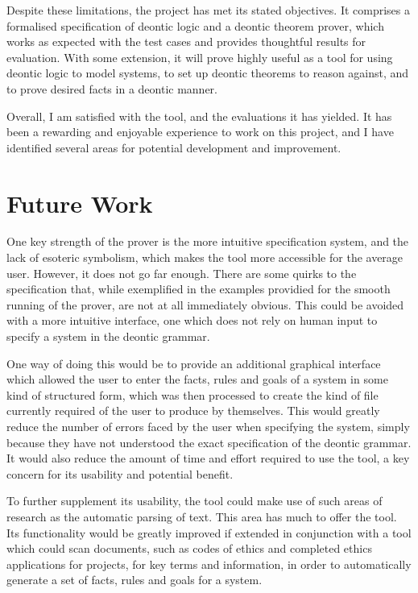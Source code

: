 \documentclass{l4proj}
\begin{document}
Despite these limitations, the project has met its stated objectives. It comprises a formalised specification of deontic logic and a deontic theorem prover, which works as expected with the test cases and provides thoughtful results for evaluation. With some extension, it will prove highly useful as a tool for using deontic logic to model systems, to set up deontic theorems to reason against, and to prove desired facts in a deontic manner. 

Overall, I am satisfied with the tool, and the evaluations it has yielded. It has been a rewarding and enjoyable experience to work on this project, and I have identified several areas for potential development and improvement. 

\section{Future Work}
One key strength of the prover is the more intuitive specification system, and the lack of esoteric symbolism, which makes the tool more accessible for the average user. However, it does not go far enough. There are some quirks to the specification that, while exemplified in the examples providied for the smooth running of the prover, are not at all immediately obvious. This could be avoided with a more intuitive interface, one which does not rely on human input to specify a system in the deontic grammar. 

One way of doing this would be to provide an additional graphical interface which allowed the user to enter the facts, rules and goals of a system in some kind of structured form, which was then processed to create the kind of file currently required of the user to produce by themselves. This would greatly reduce the number of errors faced by the user when specifying the system, simply because they have not understood the exact specification of the deontic grammar. It would also reduce the amount of time and effort required to use the tool, a key concern for its usability and potential benefit. 

To further supplement its usability, the tool could make use of such areas of research as the automatic parsing of text. This area has much to offer the tool. Its functionality would be greatly improved if extended in conjunction with a tool which could scan documents, such as codes of ethics and completed ethics applications for projects, for key terms and information, in order to automatically generate a set of facts, rules and goals for a system.  
\end{document}
